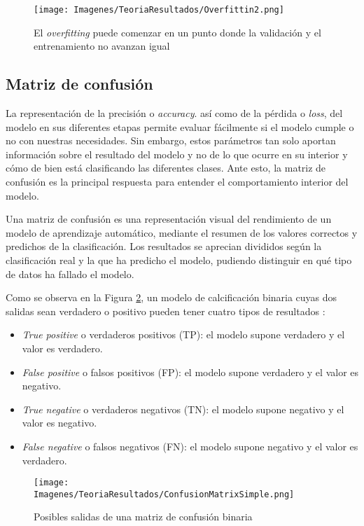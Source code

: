 \documentclass{report}
\begin{document}
\begin{figure}[hbpt]
      \centering
	 \texttt{[image: Imagenes/TeoriaResultados/Overfittin2.png]}
	 \caption{ El \textit{overfitting} puede comenzar en un punto donde la validación y el entrenamiento no avanzan igual }
	 \label{fig:Overfitting2}
\end{figure}


\subsection{Matriz de confusión}\label{ConfMat}

 La representación de la  precisión o \textit{accuracy}. así como de la pérdida o \textit{loss}, del modelo en sus diferentes etapas permite evaluar fácilmente si el modelo cumple o no con nuestras necesidades. Sin embargo, estos parámetros tan solo aportan información sobre el resultado del modelo y no de lo que ocurre en su interior y cómo de bien está clasificando las diferentes clases. Ante esto, la matriz de confusión es la principal respuesta para entender el comportamiento interior del modelo.  
 
 Una matriz de confusión es una representación visual del rendimiento de un modelo de aprendizaje automático, mediante el resumen de los valores correctos y predichos de la clasificación. Los resultados se aprecian divididos según la clasificación real y la que ha predicho el modelo, pudiendo distinguir en qué tipo de datos ha fallado el modelo. 

Como se observa en la Figura \ref{fig:MatrizCofusionSimple}, un modelo de calcificación binaria cuyas dos salidas sean verdadero o positivo pueden tener cuatro tipos de resultados \cite{ConfusionMatixSimple}:

\begin{itemize}
    \item \textit{True positive} o verdaderos positivos (TP): el modelo supone verdadero y el valor es verdadero.
    \item \textit{False positive} o falsos positivos (FP): el modelo supone verdadero y el valor es negativo.
    \item \textit{True negative} o verdaderos negativos (TN): el modelo supone negativo y el valor es negativo.
    \item \textit{False negative} o falsos negativos (FN): el modelo supone negativo y el valor es verdadero.
\end{itemize}

\begin{figure}[hbpt]
	\centering
	 \texttt{[image: Imagenes/TeoriaResultados/ConfusionMatrixSimple.png]}
	 \caption{ Posibles salidas de una matriz de confusión binaria \cite{ConfusionMatixSimple} }
	 \label{fig:MatrizCofusionSimple}
\end{figure}
\end{document}
